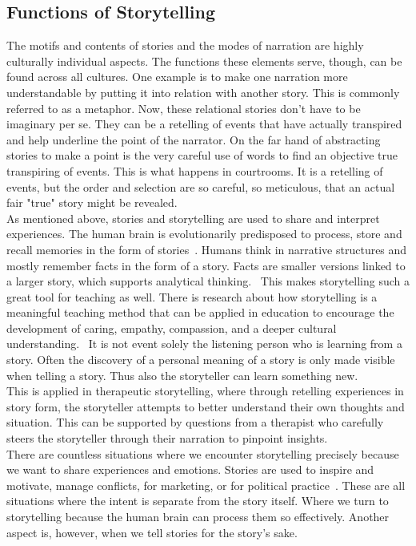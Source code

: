 \subsection{Functions of Storytelling}
The motifs and contents of stories and the modes of narration are highly culturally individual aspects. The functions these elements serve, though, can be found across all cultures. One example is to make one narration more understandable by putting it into relation with another story. This is commonly referred to as a metaphor. Now, these relational stories don't have to be imaginary per se. They can be a retelling of events that have actually transpired and help underline the point of the narrator. On the far hand of abstracting stories to make a point is the very careful use of words to find an objective true transpiring of events. This is what happens in courtrooms. It is a retelling of events, but the order and selection are so careful, so meticulous, that an actual fair "true" story might be revealed.~\cite{Rigney1992}\\
As mentioned above, stories and storytelling are used to share and interpret experiences. The human brain is evolutionarily predisposed to process, store and recall memories in the form of stories~\cite{Wyer2014}. Humans think in narrative structures and mostly remember facts in the form of a story. Facts are smaller versions linked to a larger story, which supports analytical thinking.~\cite{Connelly1990} This makes storytelling such a great tool for teaching as well. There is research about how storytelling is a meaningful teaching method that can be applied in education to encourage the development of caring, empathy, compassion, and a deeper cultural understanding.~\cite{Davidson2004} It is not event solely the listening person who is learning from a story. Often the discovery of a personal meaning of a story is only made visible when telling a story. Thus also the storyteller can learn something new.~\cite{Doty2003}\\
This is applied in therapeutic storytelling, where through retelling experiences in story form, the storyteller attempts to better understand their own thoughts and situation. This can be supported by questions from a therapist who carefully steers the storyteller through their narration to pinpoint insights.~\cite{Lawless2001}\\
There are countless situations where we encounter storytelling precisely because we want to share experiences and emotions. Stories are used to inspire and motivate, manage conflicts, for marketing, or for political practice~\cite{Jameson2001}. These are all situations where the intent is separate from the story itself. Where we turn to storytelling because the human brain can process them so effectively. Another aspect is, however, when we tell stories for the story's sake.
